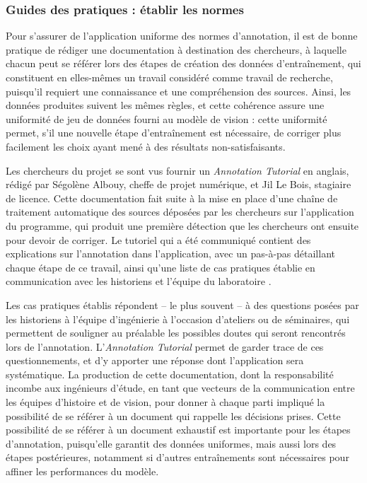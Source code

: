         \subsubsection{Guides des pratiques : établir les normes}

Pour s'assurer de l'application uniforme des normes d'annotation, il est de bonne pratique de rédiger une documentation à destination des chercheurs, à laquelle chacun peut se référer lors des étapes de création des données d'entraînement, qui constituent en elles-mêmes un travail considéré comme travail de recherche, puisqu'il requiert une connaissance et une compréhension des sources. Ainsi, les données produites suivent les mêmes règles, et cette cohérence assure une uniformité de jeu de données fourni au modèle de vision : cette uniformité permet, s'il une nouvelle étape d'entraînement est nécessaire, de corriger plus facilement les choix ayant mené à des résultats non-satisfaisants.

Les chercheurs du projet \eida se sont vus fournir un \textit{Annotation Tutorial} en anglais, rédigé par Ségolène Albouy, cheffe de projet numérique, et Jil Le Bois, stagiaire de licence. Cette documentation fait suite à la mise en place d'une chaîne de traitement automatique des sources déposées par les chercheurs sur l'application du programme, qui produit une première détection que les chercheurs ont ensuite pour devoir de corriger. Le tutoriel qui a été communiqué contient des explications sur l'annotation dans l'application, avec un pas-à-pas détaillant chaque étape de ce travail, ainsi qu'une liste de cas pratiques établie en communication avec les historiens et l'équipe du laboratoire \imagine.

Les cas pratiques établis répondent -- le plus souvent -- à des questions posées par les historiens à l'équipe d'ingénierie à l'occasion d'ateliers ou de séminaires, qui permettent de souligner au préalable les possibles doutes qui seront rencontrés lors de l'annotation. L'\textit{Annotation Tutorial} permet de garder trace de ces questionnements, et d'y apporter une réponse dont l'application sera systématique. La production de cette documentation, dont la responsabilité incombe aux ingénieurs d'étude, en tant que vecteurs de la communication entre les équipes d'histoire et de vision, pour donner à chaque parti impliqué la possibilité de se référer à un document qui rappelle les décisions prises. Cette possibilité de se référer à un document exhaustif est importante pour les étapes d'annotation, puisqu'elle garantit des données uniformes, mais aussi lors des étapes postérieures, notamment si d'autres entraînements sont nécessaires pour affiner les performances du modèle.
